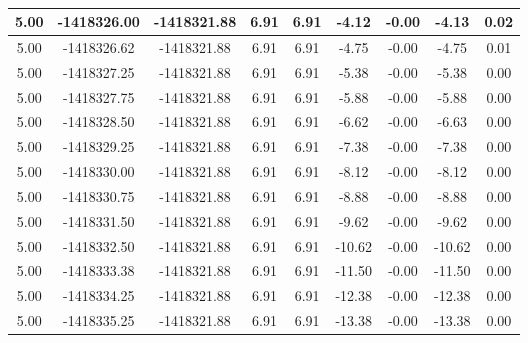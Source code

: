 \begin{table}[htbp]
\begin{adjustbox}{angle=90}
\begin{tabular}{|c|c|c|c|c|c|c|c|c|}
 5.00 & -1418326.00 & -1418321.88 & 6.91 & 6.91 & -4.12 & -0.00 & -4.13 & 0.02\\ \hline
 5.00 & -1418326.62 & -1418321.88 & 6.91 & 6.91 & -4.75 & -0.00 & -4.75 & 0.01\\ \hline
 5.00 & -1418327.25 & -1418321.88 & 6.91 & 6.91 & -5.38 & -0.00 & -5.38 & 0.00\\ \hline
 5.00 & -1418327.75 & -1418321.88 & 6.91 & 6.91 & -5.88 & -0.00 & -5.88 & 0.00\\ \hline
 5.00 & -1418328.50 & -1418321.88 & 6.91 & 6.91 & -6.62 & -0.00 & -6.63 & 0.00\\ \hline
 5.00 & -1418329.25 & -1418321.88 & 6.91 & 6.91 & -7.38 & -0.00 & -7.38 & 0.00\\ \hline
 5.00 & -1418330.00 & -1418321.88 & 6.91 & 6.91 & -8.12 & -0.00 & -8.12 & 0.00\\ \hline
 5.00 & -1418330.75 & -1418321.88 & 6.91 & 6.91 & -8.88 & -0.00 & -8.88 & 0.00\\ \hline
 5.00 & -1418331.50 & -1418321.88 & 6.91 & 6.91 & -9.62 & -0.00 & -9.62 & 0.00\\ \hline
 5.00 & -1418332.50 & -1418321.88 & 6.91 & 6.91 & -10.62 & -0.00 & -10.62 & 0.00\\ \hline
 5.00 & -1418333.38 & -1418321.88 & 6.91 & 6.91 & -11.50 & -0.00 & -11.50 & 0.00\\ \hline
 5.00 & -1418334.25 & -1418321.88 & 6.91 & 6.91 & -12.38 & -0.00 & -12.38 & 0.00\\ \hline
 5.00 & -1418335.25 & -1418321.88 & 6.91 & 6.91 & -13.38 & -0.00 & -13.38 & 0.00\\ \hline
            \end{tabular}
        \end{adjustbox}
        \caption{}
        \label{}
    \end{table}
    